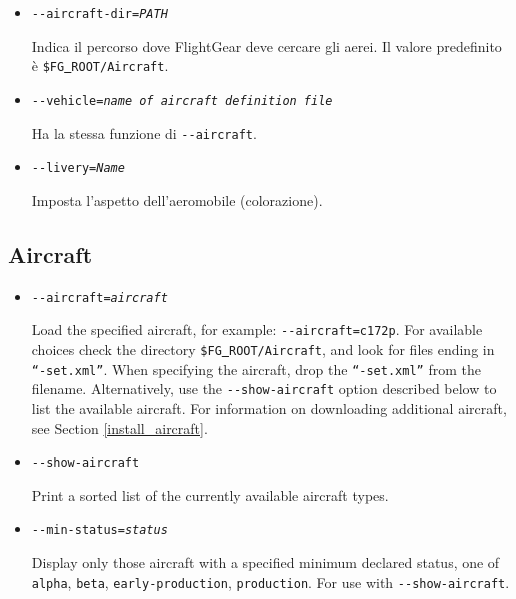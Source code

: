 \begin{itemize}
{\begin{itemize}
  \item{\texttt{-$ $-aircraft-dir={\it PATH}}}

  Indica il percorso dove FlightGear deve cercare gli aerei.
  Il valore predefinito \`{e} \texttt{\$FG\underline{~}ROOT/Aircraft}.

  \item{\texttt{-$ $-vehicle={\it name of aircraft definition file}}}

  Ha la stessa funzione di \texttt{-$ $-aircraft}.

  \item{\texttt{-$ $-livery={\it Name}}}

  Imposta l'aspetto dell'aeromobile (colorazione).

  \end{itemize}

}
{
  \subsection{Aircraft}

  \begin{itemize}
  \item{\texttt{-$ $-aircraft={\it aircraft}}}

  Load the specified aircraft, for example: \texttt{-$ $-aircraft=c172p}. For available choices
  check the directory \texttt{\$FG\underline{~}ROOT/Aircraft}, and look for files ending in \texttt{``-set.xml''}.
  When specifying the aircraft, drop the \texttt{``-set.xml''} from the filename. Alternatively, use
  the \texttt{-$ $-show-aircraft} option described below to list the available aircraft. For information
  on downloading additional aircraft, see Section \ref{install_aircraft}.

  \item{\texttt{-$ $-show-aircraft}}

  Print a sorted list of the currently available aircraft types.

  \item{\texttt{-$ $-min-status={\it status}}}

  Display only those aircraft with a specified minimum declared status, one of
  \texttt{alpha}, \texttt{beta}, \texttt{early-production}, \texttt{production}. For use with \texttt{-$ $-show-aircraft}.


\end{itemize}}
\end{itemize}
